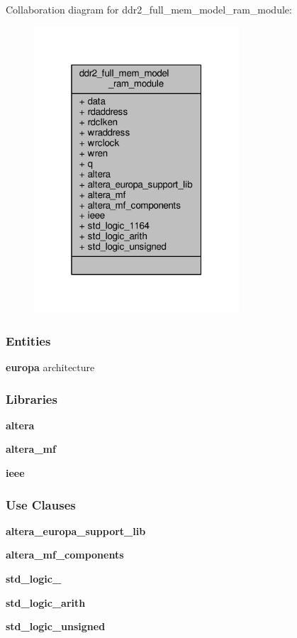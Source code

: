 Collaboration diagram for ddr2\+\_\+full\+\_\+mem\+\_\+model\+\_\+ram\+\_\+module\+:\nopagebreak
\begin{figure}[H]
\begin{center}
\leavevmode
\includegraphics[width=217pt]{d7/d3d/classddr2__full__mem__model__ram__module__coll__graph}
\end{center}
\end{figure}
\subsubsection*{Entities}
\begin{DoxyCompactItemize}
\item 
{\bf europa} architecture
\end{DoxyCompactItemize}
\subsubsection*{Libraries}
 \begin{DoxyCompactItemize}
\item 
{\bf altera} 
\item 
{\bf altera\+\_\+mf} 
\item 
{\bf ieee} 
\end{DoxyCompactItemize}
\subsubsection*{Use Clauses}
 \begin{DoxyCompactItemize}
\item 
{\bf altera\+\_\+europa\+\_\+support\+\_\+lib}   
\item 
{\bf altera\+\_\+mf\+\_\+components}   
\item 
{\bf std\+\_\+logic\+\_}   
\item 
{\bf std\+\_\+logic\+\_\+arith}   
\item 
{\bf std\+\_\+logic\+\_\+unsigned}   
\end{DoxyCompactItemize}
